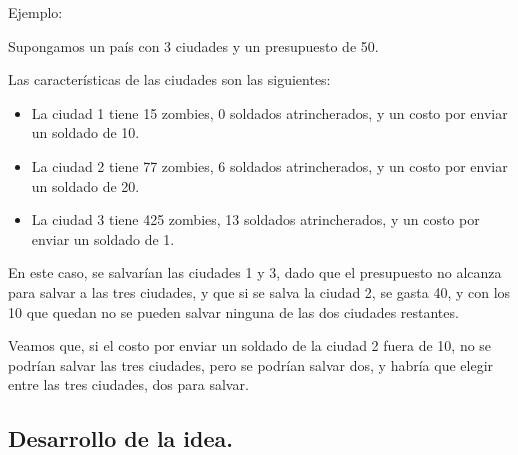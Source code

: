 Ejemplo:

Supongamos un país con 3 ciudades y un presupuesto de 50.

Las características de las ciudades son las siguientes:
\begin{itemize}
	\item La ciudad 1 tiene 15 zombies, 0 soldados atrincherados, y un costo por enviar un soldado de 10.
	\item La ciudad 2 tiene 77 zombies, 6 soldados atrincherados, y un costo por enviar un soldado de 20.
	\item La ciudad 3 tiene 425 zombies, 13 soldados atrincherados, y un costo por enviar un soldado de 1.
\end{itemize}

En este caso, se salvarían las ciudades 1 y 3, dado que el presupuesto no alcanza para salvar a las tres ciudades, y que si se salva la ciudad 2, se gasta 40, y con los 10 que quedan no se pueden salvar ninguna de las dos ciudades restantes.

Veamos que, si el costo por enviar un soldado de la ciudad 2 fuera de 10, no se podrían salvar las tres ciudades, pero se podrían salvar dos, y habría que elegir entre las tres ciudades, dos para salvar.

\vspace*{0.6cm}
\subsection{Desarrollo de la idea.}

\vspace*{0.3cm}

